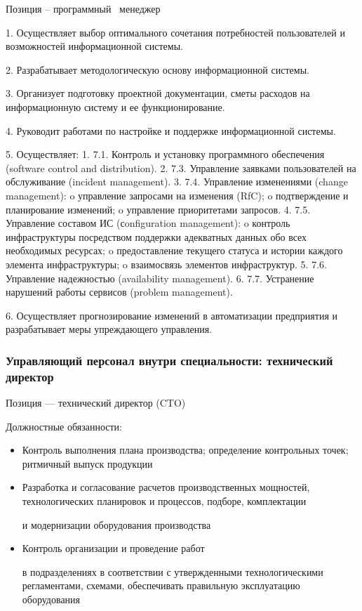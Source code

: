\documentclass{../industrial-development}
\begin{document}
\lecturenotes

Позиция – программный~\cite{hh} менеджер~\cite{itcf}~\cite{rab}

1.	Осуществляет выбор оптимального сочетания потребностей пользователей и возможностей информационной системы.

2.	Разрабатывает методологическую основу информационной системы.

3.	Организует подготовку проектной документации, сметы расходов на информационную систему и ее функционирование.

4.	Руководит работами по настройке и поддержке информационной системы.

5.	Осуществляет:
1.	7.1. Контроль и установку программного обеспечения (software control and distribution).
2.	7.3. Управление заявками пользователей на обслуживание (incident management).
3.	7.4. Управление изменениями (change management):
o	управление запросами на изменения (RfC);
o	подтверждение и планирование изменений;
o	управление приоритетами запросов.
4.	7.5. Управление составом ИС (сonfiguration management):
o	контроль инфраструктуры посредством поддержки адекватных данных обо всех необходимых ресурсах;
o	предоставление текущего статуса и истории каждого элемента инфраструктуры;
o	взаимосвязь элементов инфраструктур.
5.	7.6. Управление надежностью (availability management).
6.	7.7. Устранение нарушений работы сервисов (problem management).

6.	Осуществляет прогнозирование изменений в автоматизации предприятия и разрабатывает меры упреждающего управления.


\begin{frame} \frametitle{Управляющий персонал внутри специальности: технический директор}
 \begin{block}{}
  \alert{Позиция --- технический директор (CTO)}

Должностные обязанности: 
  \end{block}
  \begin{itemize}
  \item Контроль выполнения плана производства; определение контрольных точек; ритмичный выпуск продукции
 \item Разработка и согласование расчетов производственных мощностей, технологических планировок и  процессов, подборе, комплектации 

и модернизации оборудования производства
 \item Контроль организации и проведение работ 

в  подразделениях в соответствии с утвержденными технологическими регламентами, схемами, обеспечивать правильную эксплуатацию оборудования 
  \end{itemize}
\end{frame}
\end{document}
